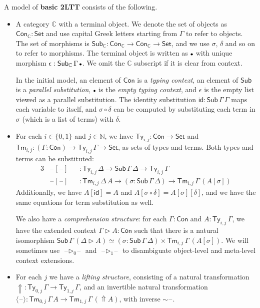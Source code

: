 \documentclass[acmsmall,anonymous,review]{acmart}
\newcommand{\msf}[1]{\mathsf{#1}}
\newcommand{\mbb}[1]{\mathbb{#1}}
\newcommand{\ext}{\triangleright}
\newcommand{\Lift}{{\Uparrow}}
\newcommand{\spl}{{\sim}}
\newcommand{\qut}[1]{\langle #1\rangle}
\newcommand{\mbbc}{\mbb{C}}
\newcommand{\Con}{\msf{Con}}
\newcommand{\Sub}{\msf{Sub}}
\newcommand{\Ty}{\msf{Ty}}
\newcommand{\Tm}{\msf{Tm}}
\newcommand{\emptycon}{\scaleobj{.75}\bullet}
\newcommand{\id}{\msf{id}}
\newcommand{\Set}{\mathsf{Set}}
\newcommand{\blank}{{\mathord{\hspace{1pt}\text{--}\hspace{1pt}}}}
\theoremstyle{remark}
\begin{document}
\begin{definition} A model of \textbf{basic 2LTT} consists of the following.
\begin{itemize}
\item
  A category $\mbbc$ with a terminal object. We denote the set of objects as
  $\Con_{\mbbc} : \Set$ and use capital Greek letters starting from $\Gamma$ to
  refer to objects. The set of morphisms is $\Sub_{\mbbc} : \Con_{\mbbc} \to
  \Con_{\mbbc} \to \Set$, and we use $\sigma$, $\delta$ and so on to refer to
  morphisms. The terminal object is written as $\emptycon$ with unique morphism
  $\epsilon : \Sub_\mbbc\,\Gamma\,\emptycon$. We omit the $\mbbc$ subscript if
  it is clear from context.

  In the initial model, an element of $\Con$ is a \emph{typing context}, an
  element of $\Sub$ is a \emph{parallel substitution}, $\emptycon$ is the
  \emph{empty typing context}, and $\epsilon$ is the empty list viewed as a
  parallel substitution. The identity substitution $\id : \Sub\,\Gamma\,\Gamma$
  maps each variable to itself, and $\sigma \circ \delta$ can be computed
  by substituting each term in $\sigma$ (which is a list of terms) with $\delta$.
\item
  For each $i \in \{0,1\}$ and $j \in \mbb{N}$, we have $\Ty_{i,j} : \Con \to
  \Set$ and $\Tm_{i,j} : (\Gamma : \Con) \to \Ty_{i,j}\,\Gamma \to \Set$, as
  sets of types and terms. Both types and terms can be substituted:
  \begin{alignat*}{3}
    & \blank\![\blank\!] &&: \Ty_{i,j}\,\Delta \to \Sub\,\Gamma\,\Delta \to \Ty_{i,j}\,\Gamma \\
    & \blank\![\blank\!] &&: \Tm_{i,j}\,\Delta\,A \to (\sigma : \Sub\,\Gamma\,\Delta) \to \Tm_{i,j}\,\Gamma\,(A[\sigma])
  \end{alignat*}
  Additionally, we have $A[\id] = A$ and $A[\sigma \circ \delta] =
  A[\sigma][\delta]$, and we have the same equations for term substitution as
  well.

  We also have a \emph{comprehension structure}: for each $\Gamma : \Con$
  and $A : \Ty_{i,j}\,\Gamma$, we have the extended context $\Gamma \ext A :
  \Con$ such that there is a natural isomorphism $\Sub\,\Gamma\,(\Delta\ext A)
  \simeq (\sigma : \Sub\,\Gamma\,\Delta) \times
  \Tm_{i,j}\,\Gamma\,(A[\sigma])$. We will sometimes use
  $\blank\!\ext_0\!\blank$ and $\blank\!\ext_1\!\blank$ to disambiguate
  object-level and meta-level context extensions.
\item
  For each $j$ we have a \emph{lifting structure}, consisting of a natural
  transformation $\Lift : \Ty_{0,j}\,\Gamma \to \Ty_{1,j}\,\Gamma$, and an
  invertible natural transformation $\qut{\blank} : \Tm_{0,j}\,\Gamma\,A \to
  \Tm_{1,j}\,\Gamma\,(\Lift A)$, with inverse $\spl\blank$.
\end{itemize}
\end{definition}
\end{document}
